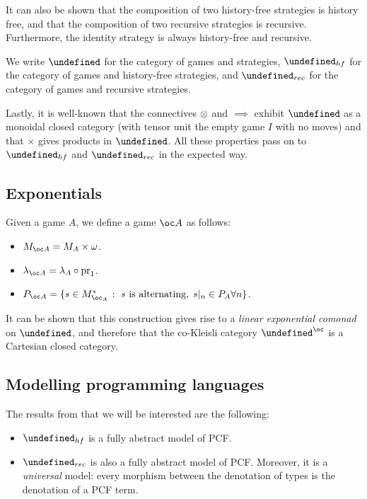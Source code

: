 \documentclass[sigplan,10pt,review]{acmart}\settopmatter{printfolios=true,printccs=false,printacmref=false}
\let\G\undefined
\begin{document}
It can also be shown that the composition of two history-free strategies is history free, and that the composition of two recursive strategies is recursive.  
Furthermore, the identity strategy is always history-free and recursive.

We write $\G$ for the category of games and strategies, $\G_{hf}$ for the category of games and history-free strategies, and $\G_{rec}$ for the category of games and recursive strategies.

Lastly, it is well-known that the connectives $\otimes$ and $\implies$ exhibit $\G$ as a monoidal closed category (with tensor unit the empty game $I$ with no moves) and that $\times$ gives products in $\G$.  
All these properties pass on to $\G_{hf}$ and $\G_{rec}$ in the expected way.

\subsection{Exponentials}

Given a game $A$, we define a game $\oc A$ as follows:
\begin{itemize}
  \item $M_{\oc A} = M_A\times\omega$.
  \item $\lambda_{\oc A} = \lambda_A \circ \pr_1$.
  \item $P_{\oc A} = \{s\in M_{\oc_A}^* \suchthat \text{$s$ is alternating},\;s\vert_n\in P_A\forall n\}$.
\end{itemize}

It can be shown \cite{ajmPcf} that this construction gives rise to a \emph{linear exponential comonad} on $\G$, and therefore that the co-Kleisli category $\G^{\oc}$ is a Cartesian closed category.  

\subsection{Modelling programming languages}

The results from \cite{ajmPcf} that we will be interested are the following:
\begin{itemize}
  \item $\G_{hf}$ is a fully abstract model of PCF.
  \item $\G_{rec}$ is also a fully abstract model of PCF.  
    Moreover, it is a \emph{universal} model: every morphism between the denotation of types is the denotation of a PCF term.
\end{itemize}
\end{document}
